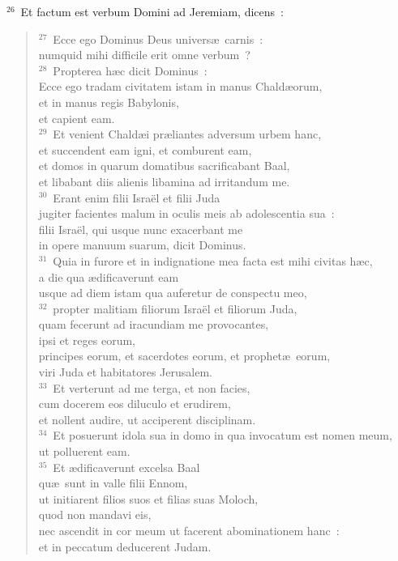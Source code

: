 

${}^{26}$~Et factum est verbum Domini ad Jeremiam, dicens~:
\begin{flushleft}\begin{verse}${}^{27}$~Ecce ego Dominus Deus univers\ae\ carnis~:\\ numquid mihi difficile erit omne verbum~?\\
${}^{28}$~Propterea h\ae c dicit Dominus~:\\ Ecce ego tradam civitatem istam in manus Chald\ae orum,\\ et in manus regis Babylonis,\\ et capient eam.\\
${}^{29}$~Et venient Chald\ae i pr\ae liantes adversum urbem hanc,\\ et succendent eam igni, et comburent eam,\\ et domos in quarum domatibus sacrificabant Baal,\\ et libabant diis alienis libamina ad irritandum me.\\
${}^{30}$~Erant enim filii Isra\"el et filii Juda\\ jugiter facientes malum in oculis meis ab adolescentia sua~:\\ filii Isra\"el, qui usque nunc exacerbant me\\ in opere manuum suarum, dicit Dominus.\\
${}^{31}$~Quia in furore et in indignatione mea facta est mihi civitas h\ae c,\\ a die qua \ae dificaverunt eam\\ usque ad diem istam qua auferetur de conspectu meo,\\
${}^{32}$~propter malitiam filiorum Isra\"el et filiorum Juda,\\ quam fecerunt ad iracundiam me provocantes,\\ ipsi et reges eorum,\\ principes eorum, et sacerdotes eorum, et prophet\ae\ eorum,\\ viri Juda et habitatores Jerusalem.\\
${}^{33}$~Et verterunt ad me terga, et non facies,\\ cum docerem eos diluculo et erudirem,\\ et nollent audire, ut acciperent disciplinam.\\
${}^{34}$~Et posuerunt idola sua in domo in qua invocatum est nomen meum,\\ ut polluerent eam.\\
${}^{35}$~Et \ae dificaverunt excelsa Baal\\ qu\ae\ sunt in valle filii Ennom,\\ ut initiarent filios suos et filias suas Moloch,\\ quod non mandavi eis,\\ nec ascendit in cor meum ut facerent abominationem hanc~:\\ et in peccatum deducerent Judam.\\

\end{verse}
\end{flushleft}
